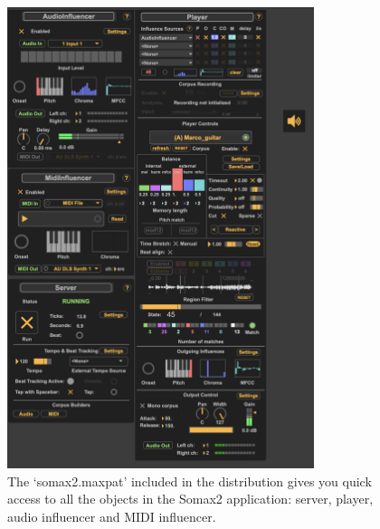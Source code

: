 \begin{figure}[H]
    \centering        
 	\includegraphics[width=0.8\textwidth]{img/somax2-7.png}
    \caption{The `somax2.maxpat' included in the distribution gives you quick access to all the objects in the Somax2 application: server, player, audio influencer and MIDI influencer.}
    \label{fig:somax2_ui}
\end{figure}

